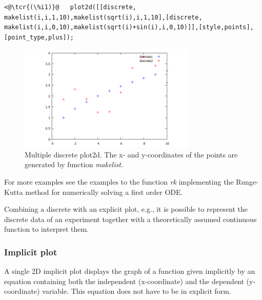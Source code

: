 \documentclass[../Maxima_Workbook.tex]{subfiles}
\begin{document}
\lz \begin{lstlisting}
<@\tcr{(\%i1)}@   plot2d([[discrete, makelist(i,i,1,10),makelist(sqrt(i),i,1,10],[discrete, makelist(i,i,0,10),makelist(sqrt(i)+sin(i),i,0,10)]],[style,points],[point_type,plus]);
\end{lstlisting}
\vspace{-2mm} 

\begin{figure}
	\centering
	\includegraphics[width=0.75\textwidth]{Pl_discrete_plot2d.png}
	\caption{Multiple discrete plot2d. The x- and y-coordinates of the points are generated by function \emph{makelist}.}
	\label{Pl-Fig6}
\end{figure}

For more examples see the examples to the function \emph{rk} implementing the Runge-Kutta method for numerically solving a first order ODE.

\lz Combining a discrete with an explicit plot, e.g., it is possible to represent the discrete data of an experiment together with a theoretically assumed continuous function to interpret them.

\subsubsection{Implicit plot}

A single 2D implicit plot displays the graph of a function given implicitly by an equation containing both the independent (x-coordinate) and the dependent (y-coordinate) variable. This equation does not have to be in explicit form.

\lz {} \hfill \tcr{[function]}

 \hfill \tcr{[function]}
\end{document}
